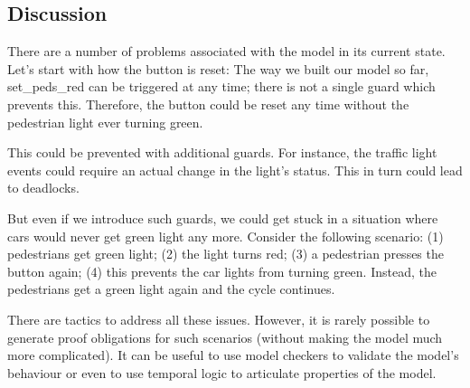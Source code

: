 \subsection{Discussion}
\label{tut_concepts_discussion2}

There are a number of problems associated with the model in its current state.  Let's start with how the button is reset: The way we built our model so far, \textsf{set\_peds\_red} can be triggered at any time; there is not a single guard which prevents this.  Therefore, the button could be reset any time without the pedestrian light ever turning green.

This could be prevented with additional guards. For instance, the traffic light events could require an actual change in the light's status.  This in turn could lead to deadlocks.

But even if we introduce such guards, we could get stuck in a situation where cars would never get green light any more.  Consider the following scenario: (1) pedestrians get green light; (2) the light turns red; (3) a pedestrian presses the button again; (4) this prevents the car lights from turning green. Instead, the pedestrians get a green light again and the cycle continues.

There are tactics to address all these issues.  However, it is rarely possible to generate proof obligations for such scenarios (without making the model much more complicated).  It can be useful to use model checkers to validate the model's behaviour or even to use temporal logic to articulate properties of the model.



